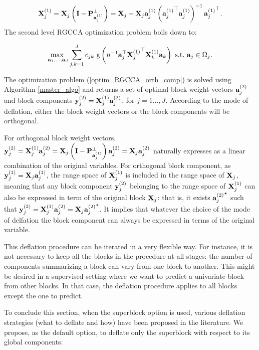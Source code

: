 \documentclass[
]{jss}
\begin{document}
\[\mathbf{X}_j^{(1)} = \mathbf{X}_j \left(\mathbf{I} - \mathbf{P}^\perp_{\mathbf{a}_j^{(1)}} \right) = \mathbf{X}_j - \mathbf{X}_j\mathbf{a}_j^{(1)} \left( {\mathbf{a}_j^{(1)}}^\top \mathbf{a}_j^{(1)} \right)^{-1}{\mathbf{a}_j^{(1)}}^\top.\]
The second level RGCCA optimization problem boils down to:

\begin{equation}
        \underset{\mathbf{a}_1, \ldots,\mathbf{a}_J}{\text{max~}} \sum_{j, k = 1}^J c_{jk} \text{ g}\left(n^{-1}\mathbf{a}_j^\top {\mathbf{X}_j^{(1)}}^\top \mathbf{X}_k^{(1)} \mathbf{a}_k \right)
        \text{~s.t.~} \mathbf{a}_j \in \Omega_j.
    \label{optim_RGCCA_orth_comp}
\end{equation}

The optimization problem (\ref{optim_RGCCA_orth_comp}) is solved using
Algorithm \ref{master_algo} and returns a set of optimal block weight
vectors \(\mathbf{a}_j^{(2)}\) and block components
\(\mathbf{y}_j^{(2)} = \mathbf{X}_j^{(1)}\mathbf{a}_j^{(2)}\), for \(j = 1\ldots, J\).
According to the mode of deflation, either the block weight vectors or
the block components will be orthogonal.

For orthogonal block weight vectors,
\(\mathbf{y}_j^{(2)} = \mathbf{X}_j^{(1)}\mathbf{a}_j^{(2)} = \mathbf{X}_j \left(\mathbf{I} - \mathbf{P}^\perp_{\mathbf{a}_j^{(1)}} \right)\mathbf{a}_j^{(2)} = \mathbf{X}_j \mathbf{a}_j^{(2)}\)
naturally expresses as a linear combination of the original variables.
For orthogonal block component, as \(\mathbf{y}_j^{(1)} = \mathbf{X}_j\mathbf{a}_j^{(1)}\),
the range space of \(\mathbf{X}_j^{(1)}\) is included in the range space of
\(\mathbf{X}_j\), meaning that any block component \(\mathbf{y}_j^{(2)}\) belonging to
the range space of \(\mathbf{X}_j^{(1)}\) can also be expressed in term of the
original block \(\mathbf{X}_j\): that is, it exists \({\mathbf{a}_j^{(2)}}^\star\)
such that
\(\mathbf{y}_j^{(2)} = \mathbf{X}_j^{(1)}\mathbf{a}_j^{(2)} = \mathbf{X}_j{\mathbf{a}_j^{(2)}}^\star\). It
implies that whatever the choice of the mode of delfation the block
component can always be expressed in terms of the original variable.

This deflation procedure can be iterated in a very flexible way. For
instance, it is not necessary to keep all the blocks in the procedure at
all stages: the number of components summarizing a block can vary from
one block to another. This might be desired in a supervised setting
where we want to predict a univariate block from other blocks. In that
case, the deflation procedure applies to all blocks except the one to
predict.

To conclude this section, when the superblock option is used, various
deflation strategies (what to deflate and how) have been proposed in the
literature. We propose, as the default option, to deflate only the
superblock with respect to its global components:
\end{document}
